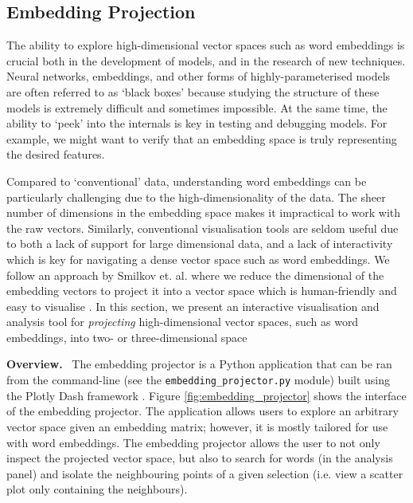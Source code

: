 \documentclass{paper}
\newcommand{\inlineSection}[1]{\vspace{0.5em}\noindent\textbf{#1.}~}
\begin{document}

\subsection{Embedding Projection}
The ability to explore high-dimensional vector spaces such as word embeddings is crucial both in the development of models, and in the research of new techniques. Neural networks, embeddings, and other forms of highly-parameterised models are often referred to as `black boxes' because studying the structure of these models is extremely difficult and sometimes impossible. At the same time, the ability to `peek' into the internals is key in testing and debugging models. For example, we might want to verify that an embedding space is truly representing the desired features. 

Compared to `conventional' data, understanding word embeddings can be particularly challenging due to the high-dimensionality of the data. The sheer number of dimensions in the embedding space makes it impractical to work with the raw vectors. Similarly, conventional visualisation tools are seldom useful due to both a lack of support for large dimensional data, and a lack of interactivity which is key for navigating a dense vector space such as word embeddings. We follow an approach by Smilkov et. al. where we reduce the dimensional of the embedding vectors to project it into a vector space which is human-friendly and easy to visualise \cite{smilkov2016embedding}. In this section, we present an interactive visualisation and analysis tool for \textit{projecting} high-dimensional vector spaces, such as word embeddings, into two- or three-dimensional space 

\inlineSection{Overview} The embedding projector is a Python application that can be ran from the command-line (see the \texttt{embedding\_projector.py} module) built using the Plotly Dash framework \cite{plotly}. Figure \ref{fig:embedding_projector} shows the interface of the embedding projector. The application allows users to explore an arbitrary vector space given an embedding matrix; however, it is mostly tailored for use with word embeddings. The embedding projector allows the user to not only inspect the projected vector space, but also to search for words (in the analysis panel) and isolate the neighbouring points of a given selection (i.e. view a scatter plot only containing the neighbours).
\end{document}
